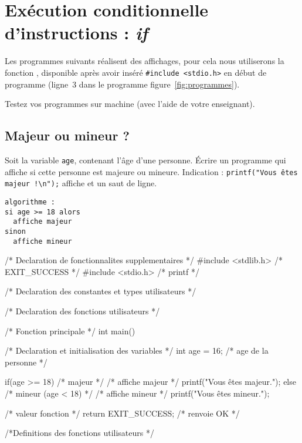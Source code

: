 
\section{Exécution conditionnelle d'instructions :  \emph{if}}
Les programmes suivants réalisent des affichages, pour cela nous
utiliserons la fonction , disponible après avoir inséré
\verb|#include <stdio.h>| en début de programme (ligne~3 dans le
programme figure~\ref{fig:programmes}).

Testez vos programmes sur
machine (avec l'aide de votre enseignant).

\subsection{Majeur ou mineur ?}

Soit la variable \verb|age|, contenant l'âge d'une personne. Écrire un
programme qui affiche si cette personne est majeure ou
mineure. Indication : \verb|printf("Vous êtes majeur !\n");| affiche
 et un saut de ligne.

\begin{correction}
\begin{verbatim}
algorithme :
si age >= 18 alors
  affiche majeur
sinon
  affiche mineur
\end{verbatim}
\begin{listing}{1}
/* Declaration de fonctionnalites supplementaires */
#include <stdlib.h> /* EXIT_SUCCESS */
#include <stdio.h> /* printf */

/* Declaration des constantes et types utilisateurs */

/* Declaration des fonctions utilisateurs */

/* Fonction principale */
int main()
{
    /* Declaration et initialisation des variables */
    int age = 16; /* age de la personne */

    if(age >= 18) /* majeur */
    {
	/* affiche majeur */
	printf("Vous êtes majeur.\n");
    }
    else /* mineur (age < 18) */
    {
	/* affiche mineur */
	printf("Vous êtes mineur.\n");
    }

    /* valeur fonction */
    return EXIT_SUCCESS; /* renvoie OK */
}

/*Definitions des fonctions utilisateurs */
\end{listing}
\end{correction}

